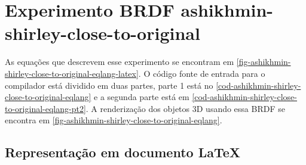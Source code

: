 \section{Experimento BRDF ashikhmin-shirley-close-to-original}

As equações que descrevem esse experimento se encontram em \autoref{fig-ashikhmin-shirley-close-to-original-eqlang-latex}. O código fonte de entrada para o compilador está dividido em duas partes, parte 1 está no \autoref{cod-ashikhmin-shirley-close-to-original-eqlang} e a segunda parte está em \autoref{cod-ashikhmin-shirley-close-to-original-eqlang-pt2}. A renderização dos objetos 3D usando essa BRDF se encontra em \autoref{fig-ashikhmin-shirley-close-to-original-eqlang}.

\subsection{Representação em documento \LaTeX{}}
